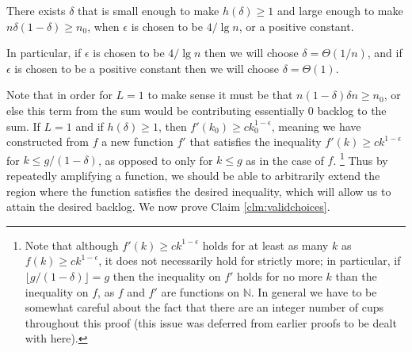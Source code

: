 
\begin{clm}
  \label{clm:validchoices}
  There exists $\delta$ that is small enough to make $h(\delta)
  \ge 1$ and large enough to make $n\delta(1-\delta) \ge
  n_0$, when $\epsilon$ is chosen to be $4/\lg n$, or a positive constant. 

  In particular, if $\epsilon$ is chosen to be $4/\lg n$ then we will choose
  $\delta =\Theta(1/n)$, and if $\epsilon$ is chosen to be a positive
  constant then we will choose $\delta = \Theta(1)$.
\end{clm}

Note that in order for $L =1$ to make sense it must be that
$n(1-\delta)\delta n \ge n_0$, or else this term from the sum would be
contributing essentially $0$ backlog to the sum.
If $L=1$ and if $h(\delta)\ge 1$, then $f'(k_0) \ge c k_0^{1-\epsilon}$, meaning
we have constructed from $f$ a new function $f'$ that satisfies the
inequality $f'(k) \ge ck^{1-\epsilon}$ for $k\le g/(1-\delta)$, as opposed to
only for $k \le g$ as in the case of $f$. 
\footnote{Note that although $f'(k) \ge ck^{1-\epsilon}$ holds for at least
  as many $k$ as $f(k) \ge c k^{1-\epsilon}$, it does not necessarily hold
  for strictly more; in particular, if $\lfloor g/(1-\delta) \rfloor = g$
  then the inequality on $f'$ holds for no more $k$ than the inequality on
  $f$, as $f$ and $f'$ are functions on $\mathbb{N}$. In general we have to
  be somewhat careful about the fact that there are an integer number of cups
  throughout this proof (this issue was deferred from earlier proofs to be
dealt with here).} 
Thus by repeatedly amplifying a function, we should be able to arbitrarily
extend the region where the function satisfies the desired inequality, which
will allow us to attain the desired backlog.
We now prove Claim \ref{clm:validchoices}.
